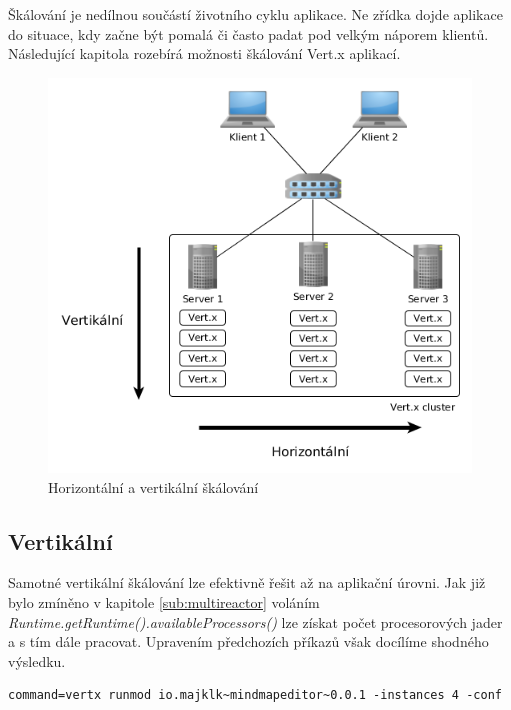 Škálování je nedílnou součástí životního cyklu aplikace. Ne zřídka dojde aplikace do situace, kdy začne být pomalá či často padat pod velkým náporem klientů. Následující kapitola rozebírá možnosti škálování Vert.x aplikací.
\begin{figure}
\begin{centering}
\includegraphics[scale=0.5]{obrazky/scaling_example}
\par\end{centering}
\caption{Horizontální a vertikální škálování\label{fig:scaling_example}}
\end{figure}
\FloatBarrier

\subsection{Vertikální}

Samotné vertikální škálování lze efektivně řešit až na aplikační úrovni. Jak již bylo zmíněno v kapitole \ref{sub:multireactor} voláním \emph{Runtime.getRuntime().availableProcessors()} lze získat počet procesorových jader a s tím dále pracovat. Upravením předchozích příkazů však docílíme shodného výsledku.

\begin{lstlisting}
command=vertx runmod io.majklk~mindmapeditor~0.0.1 -instances 4 -conf
\end{lstlisting}

